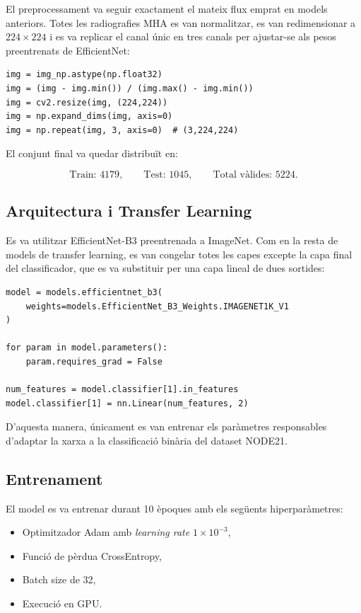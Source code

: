 \documentclass[12pt,a4paper]{article}
\begin{document}
El preprocessament va seguir exactament el mateix flux emprat en models anteriors.
Totes les radiografies MHA es van normalitzar, es van redimensionar a $224 \times 224$ i
es va replicar el canal únic en tres canals per ajustar-se als pesos preentrenats de
EfficientNet:

\begin{lstlisting}[style=mypython]
img = img_np.astype(np.float32)
img = (img - img.min()) / (img.max() - img.min())
img = cv2.resize(img, (224,224))
img = np.expand_dims(img, axis=0)
img = np.repeat(img, 3, axis=0)  # (3,224,224)
\end{lstlisting}

El conjunt final va quedar distribuït en:

\[
\text{Train: }4179,\qquad
\text{Test: }1045,\qquad
\text{Total vàlides: }5224.
\]

\subsection{Arquitectura i Transfer Learning}

Es va utilitzar EfficientNet-B3 preentrenada a ImageNet. Com en la resta de models de
transfer learning, es van congelar totes les capes excepte la capa final del classificador,
que es va substituir per una capa lineal de dues sortides:

\begin{lstlisting}[style=mypython]
model = models.efficientnet_b3(
    weights=models.EfficientNet_B3_Weights.IMAGENET1K_V1
)

for param in model.parameters():
    param.requires_grad = False

num_features = model.classifier[1].in_features
model.classifier[1] = nn.Linear(num_features, 2)
\end{lstlisting}

D’aquesta manera, únicament es van entrenar els paràmetres responsables d’adaptar la xarxa
a la classificació binària del dataset NODE21.

\subsection{Entrenament}

El model es va entrenar durant 10 èpoques amb els següents hiperparàmetres:

\begin{itemize}
    \item Optimitzador Adam amb \textit{learning rate} $1 \times 10^{-3}$,
    \item Funció de pèrdua CrossEntropy,
    \item Batch size de 32,
    \item Execució en GPU.
\end{itemize}
\end{document}
